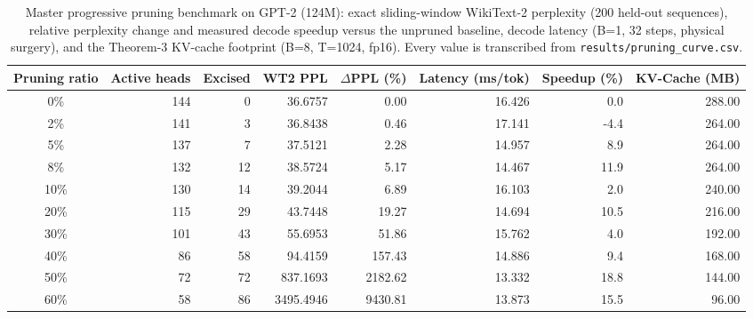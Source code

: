 \documentclass[11pt]{article}
\begin{document}
\begin{table}[htbp][!t]
\caption{Master progressive pruning benchmark on GPT-2 (124M): exact sliding-window
WikiText-2 perplexity (200 held-out sequences), relative perplexity change and
measured decode speedup versus the unpruned baseline, decode latency (B=1, 32
steps, physical surgery), and the Theorem-3 KV-cache footprint (B=8, T=1024,
fp16). Every value is transcribed from \texttt{results/pruning\_curve.csv}.}
\label{tab:master}
\centering
\small
\begin{tabular}{crrrrrrr}
\toprule
Pruning ratio & Active heads & Excised & WT2 PPL & $\Delta$PPL (\%) & Latency (ms/tok) & Speedup (\%) & KV-Cache (MB) \\
\midrule
0\% & 144 & 0 & 36.6757 & 0.00 & 16.426 & 0.0 & 288.00 \\
2\% & 141 & 3 & 36.8438 & 0.46 & 17.141 & -4.4 & 264.00 \\
5\% & 137 & 7 & 37.5121 & 2.28 & 14.957 & 8.9 & 264.00 \\
8\% & 132 & 12 & 38.5724 & 5.17 & 14.467 & 11.9 & 264.00 \\
10\% & 130 & 14 & 39.2044 & 6.89 & 16.103 & 2.0 & 240.00 \\
20\% & 115 & 29 & 43.7448 & 19.27 & 14.694 & 10.5 & 216.00 \\
30\% & 101 & 43 & 55.6953 & 51.86 & 15.762 & 4.0 & 192.00 \\
40\% & 86 & 58 & 94.4159 & 157.43 & 14.886 & 9.4 & 168.00 \\
50\% & 72 & 72 & 837.1693 & 2182.62 & 13.332 & 18.8 & 144.00 \\
60\% & 58 & 86 & 3495.4946 & 9430.81 & 13.873 & 15.5 & 96.00 \\
\bottomrule
\end{tabular}
\end{table}
\end{document}

